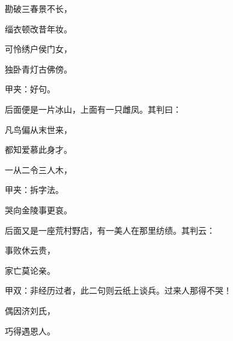 \begin{poem}
    \begin{pl}勘破三春景不长，\end{pl}

    \begin{pl}缁衣顿改昔年妆。\end{pl}

    \begin{pl}可怜绣户侯门女，\end{pl}

    \begin{pl}独卧青灯古佛傍。\end{pl}

    \begin{note}甲夹：好句。\end{note}
\end{poem}

\begin{parag}
    后面便是一片冰山，上面有一只雌凤。其判曰：
\end{parag}


\begin{poem}
    \begin{pl}凡鸟偏从末世来，\end{pl}

    \begin{pl}都知爱慕此身才。\end{pl}

    \begin{pl}一从二令三人木，\end{pl}\begin{note}甲夹：拆字法。\end{note}

    \begin{pl}哭向金陵事更哀。\end{pl}
\end{poem}
\begin{parag}
    后面又是一座荒村野店，有一美人在那里纺绩。其判云：
\end{parag}


\begin{poem}
    \begin{pl}事败休云贵，\end{pl}

    \begin{pl}家亡莫论亲。\end{pl}\begin{note}甲双：非经历过者，此二句则云纸上谈兵。过来人那得不哭！\end{note}

    \begin{pl}偶因济刘氏，\end{pl}

    \begin{pl}巧得遇恩人。\end{pl}

\end{poem}

